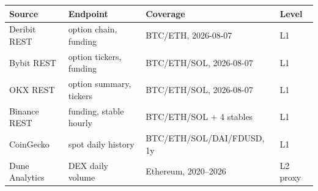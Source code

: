 \begin{tabular}{@{}llll@{}}
\toprule
Source & Endpoint & Coverage & Level \\
\midrule
Deribit REST & option chain, funding & BTC/ETH, 2026-08-07 & L1 \\
Bybit REST & option tickers, funding & BTC/ETH/SOL, 2026-08-07 & L1 \\
OKX REST & option summary, tickers & BTC/ETH/SOL, 2026-08-07 & L1 \\
Binance REST & funding, stable hourly & BTC/ETH/SOL + 4 stables & L1 \\
CoinGecko & spot daily history & BTC/ETH/SOL/DAI/FDUSD, 1y & L1 \\
Dune Analytics & DEX daily volume & Ethereum, 2020--2026 & L2 proxy \\
\bottomrule
\end{tabular}